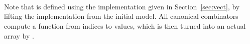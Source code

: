\begin{code}
\<%
\\
%
\>[2]\AgdaSpace{}%
\AgdaSpace{}%
\AgdaSpace{}%
\AgdaSpace{}%
%
\>[28]\AgdaSymbol{=}\AgdaSpace{}%
\AgdaSpace{}%
\AgdaSpace{}%
\AgdaSpace{}%
\AgdaSpace{}%
\AgdaSpace{}%
\AgdaSymbol{(}\AgdaSpace{}%
\AgdaOperator{\AgdaFunction{[}}\AgdaSpace{}%
\AgdaSpace{}%
\AgdaOperator{\AgdaFunction{]}}\AgdaSymbol{)}\AgdaSpace{}%
\AgdaSymbol{(}\AgdaSpace{}%
\AgdaOperator{\AgdaFunction{[}}\AgdaSpace{}%
\AgdaSpace{}%
\AgdaOperator{\AgdaFunction{]}}\AgdaSymbol{)}\<%
\\
%
\>[2]\AgdaSpace{}%
\AgdaSpace{}%
\AgdaSpace{}%
\AgdaSpace{}%
%
\>[28]\AgdaSymbol{=}\AgdaSpace{}%
\AgdaSpace{}%
\AgdaSpace{}%
\AgdaOperator{\AgdaInductiveConstructor{,}}\AgdaSpace{}%
\AgdaSpace{}%
\AgdaSymbol{=}\AgdaSpace{}%
\AgdaSpace{}%
\AgdaSpace{}%
\AgdaSpace{}%
\AgdaSpace{}%
\AgdaSpace{}%
\AgdaSpace{}%
\AgdaSpace{}%
\AgdaSpace{}%
\AgdaOperator{\AgdaInductiveConstructor{,}}\AgdaSpace{}%
\AgdaSpace{}%
\AgdaSpace{}%
\<%
\\
\>[0]\<%
\end{code}
Note that  is defined using the implementation given in
Section~\ref{sec:vect}, by lifting the implementation from the initial model.
All canonical combinators compute a function from indices to values, which is
then turned into an actual array by .

